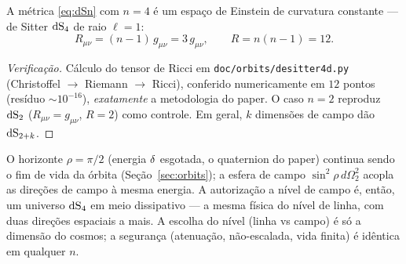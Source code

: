 \begin{theorem}\label{thm:dS4}
A métrica \eqref{eq:dSn} com $n=4$ é um espaço de Einstein de curvatura
constante --- de Sitter $\mathrm{dS}_4$ de raio $\ell=1$:
\[
  R_{\mu\nu}=(n-1)\,g_{\mu\nu}=3\,g_{\mu\nu},\qquad R=n(n-1)=12.
\]
\end{theorem}
\begin{proof}[Verificação]
Cálculo do tensor de Ricci em \texttt{doc/orbits/desitter4d.py} (Christoffel
$\to$ Riemann $\to$ Ricci), conferido numericamente em $12$ pontos (resíduo
$\sim10^{-16}$), \emph{exatamente} a metodologia do paper. O caso $n=2$
reproduz $\mathrm{dS}_2$ ($R_{\mu\nu}=g_{\mu\nu}$, $R=2$) como controle. Em geral,
$k$ dimensões de campo dão $\mathrm{dS}_{2+k}$.
\end{proof}

\begin{remark}
O horizonte $\rho=\pi/2$ (energia $\delta$ esgotada, o quaternion do paper)
continua sendo o fim de vida da órbita (Seção~\ref{sec:orbits}); a esfera de
campo $\sin^2\!\rho\,d\Omega^2_2$ acopla as direções de campo à mesma energia.
A autorização a nível de campo é, então, um universo $\mathrm{dS}_4$ em meio
dissipativo --- a mesma física do nível de linha, com duas direções
espaciais a mais. A escolha do nível (linha vs campo) é só a dimensão do
cosmos; a segurança (atenuação, não-escalada, vida finita) é idêntica em
qualquer $n$.
\end{remark}

